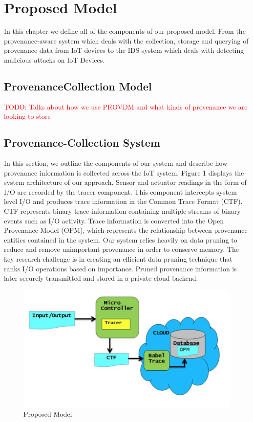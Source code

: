 
\chapter{Proposed Model}

In this chapter we define all of the components of our proposed model. From the provenance-aware system which deals with the collection, storage and querying of provenance data from IoT devices to the  IDS system which deals with detecting malicious attacks on IoT Devices.

\section{Provenance\-Collection Model}

\textcolor{red}{TODO: Talks about how we use PROV\-DM and what kinds of provenance we are looking to store}

\section{Provenance-Collection System}

In this section, we outline the components of our system and describe how provenance information is collected across the IoT system. Figure 1 displays the system architecture of our approach. Sensor and actuator readings in the form of I/O are recorded by the tracer component. This component intercepts system level I/O and produces trace information in the Common Trace Format (CTF). CTF represents binary trace information containing multiple streams of binary events such as I/O activity. Trace information is converted into the Open Provenance Model (OPM), which represents the relationship between provenance entities contained in the system. Our system relies heavily on data pruning to reduce and remove unimportant provenance in order to conserve memory. The key research challenge is in creating an efficient data pruning technique that ranks I/O operations based on importance. Pruned provenance information is later securely transmitted and stored in a private cloud backend.

\begin{figure}[h]
\begin{center}

\includegraphics{architecture.PNG}    
\end{center}
\caption{Proposed Model}
\label{autom}
\end{figure}

